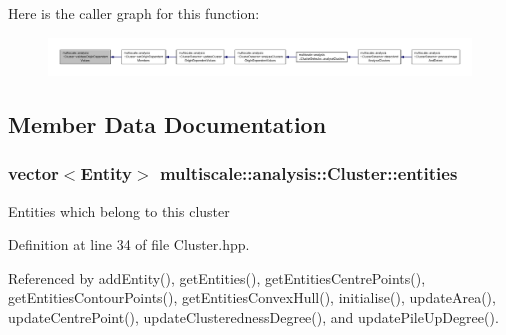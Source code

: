 Here is the caller graph for this function\-:\nopagebreak
\begin{figure}[H]
\begin{center}
\leavevmode
\includegraphics[width=350pt]{classmultiscale_1_1analysis_1_1Cluster_a26b9c11e63bfdbfc837a35f68c5c40dd_icgraph}
\end{center}
\end{figure}




\subsection{Member Data Documentation}
\hypertarget{classmultiscale_1_1analysis_1_1Cluster_a820298479651328fb79d92a65f7923d6}{
\subsubsection[{entities}]{\setlength{\rightskip}{0pt plus 5cm}vector$<${\bf Entity}$>$ multiscale\-::analysis\-::\-Cluster\-::entities\hspace{0.3cm}{\ttfamily [private]}}}\label{classmultiscale_1_1analysis_1_1Cluster_a820298479651328fb79d92a65f7923d6}
Entities which belong to this cluster 

Definition at line 34 of file Cluster.\-hpp.



Referenced by add\-Entity(), get\-Entities(), get\-Entities\-Centre\-Points(), get\-Entities\-Contour\-Points(), get\-Entities\-Convex\-Hull(), initialise(), update\-Area(), update\-Centre\-Point(), update\-Clusteredness\-Degree(), and update\-Pile\-Up\-Degree().

